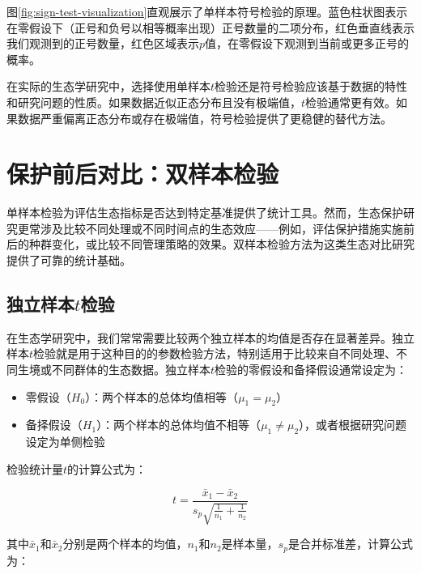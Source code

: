 \documentclass[
  twoside,12pt,fontset=none]{ctexbook}
\providecommand{\tightlist}{%
  \setlength{\itemsep}{0pt}\setlength{\parskip}{0pt}}
\begin{document}
图\ref{fig:sign-test-visualization}直观展示了单样本符号检验的原理。蓝色柱状图表示在零假设下（正号和负号以相等概率出现）正号数量的二项分布，红色垂直线表示我们观测到的正号数量，红色区域表示\(p\)值，在零假设下观测到当前或更多正号的概率。

在实际的生态学研究中，选择使用单样本\(t\)检验还是符号检验应该基于数据的特性和研究问题的性质。如果数据近似正态分布且没有极端值，\(t\)检验通常更有效。如果数据严重偏离正态分布或存在极端值，符号检验提供了更稳健的替代方法。

\hypertarget{ux4fddux62a4ux524dux540eux5bf9ux6bd4ux53ccux6837ux672cux68c0ux9a8c}{%
\section{保护前后对比：双样本检验}\label{ux4fddux62a4ux524dux540eux5bf9ux6bd4ux53ccux6837ux672cux68c0ux9a8c}}

单样本检验为评估生态指标是否达到特定基准提供了统计工具。然而，生态保护研究更常涉及比较不同处理或不同时间点的生态效应------例如，评估保护措施实施前后的种群变化，或比较不同管理策略的效果。双样本检验方法为这类生态对比研究提供了可靠的统计基础。

\hypertarget{ux72ecux7acbux6837ux672ctux68c0ux9a8c}{%
\subsection{\texorpdfstring{独立样本\(t\)检验}{独立样本t检验}}\label{ux72ecux7acbux6837ux672ctux68c0ux9a8c}}

在生态学研究中，我们常常需要比较两个独立样本的均值是否存在显著差异。独立样本\(t\)检验就是用于这种目的的参数检验方法，特别适用于比较来自不同处理、不同生境或不同群体的生态数据。独立样本\(t\)检验的零假设和备择假设通常设定为：

\begin{itemize}
\tightlist
\item
  零假设（\(H_0\)）：两个样本的总体均值相等（\(\mu_1 = \mu_2\)）
\item
  备择假设（\(H_1\)）：两个样本的总体均值不相等（\(\mu_1 \neq \mu_2\)），或者根据研究问题设定为单侧检验
\end{itemize}

检验统计量\(t\)的计算公式为：

\[t = \frac{\bar{x}_1 - \bar{x}_2}{s_p \sqrt{\frac{1}{n_1} + \frac{1}{n_2}}}\]

其中\(\bar{x}_1\)和\(\bar{x}_2\)分别是两个样本的均值，\(n_1\)和\(n_2\)是样本量，\(s_p\)是合并标准差，计算公式为：
\end{document}
